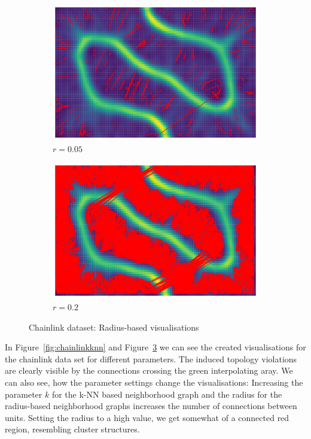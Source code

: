 \documentclass[12pt]{article}
\begin{document}
\begin{figure}[t]
    \centering
    \begin{subfigure}{.5\textwidth}
        \centering
        \includegraphics[width=.9\linewidth]{vis/chainlink_r_005.png}
        \caption{$r=0.05$}
        \label{fig:chainlinkr0.05}
    \end{subfigure}%
    \begin{subfigure}{.5\textwidth}
        \centering
        \includegraphics[width=.9\linewidth]{vis/chainlink_r_02.png}
        \caption{$r=0.2$}
        \label{fig:chainlinkr0.2}
    \end{subfigure}
    \caption{Chainlink dataset: Radius-based visualisations}
    \label{fig:chainlinkradius}
\end{figure}
In Figure~\ref{fig:chainlinkknn} and Figure~\ref{fig:chainlinkradius} we can see the created visualisations for the chainlink data set for different parameters.
The induced topology violations are clearly visible by the connections crossing the green interpolating aray.
We can also see, how the parameter settings change the visualisations:
Increasing the parameter $k$ for the k-NN based neighborhood graph and the radius for the radius-based neighborhood graphs increases the number of connections between units.
Setting the radius to a high value, we get somewhat of a connected red region, resembling cluster structures.
\end{document}
